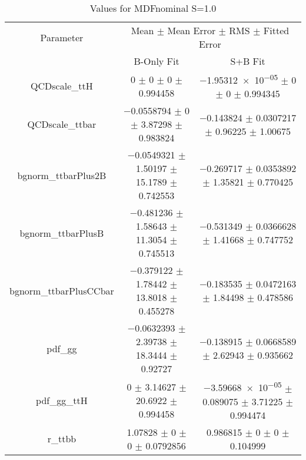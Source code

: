 \begin{table}
\centering
\caption{Values for MDFnominal S=1.0}
\begin{tabular}{ccc}
\toprule
Parameter & \multicolumn{2}{c}{Mean $\pm$ Mean Error $\pm$ RMS $\pm$ Fitted Error}\\
 & B-Only Fit & S+B Fit\\
\midrule
QCDscale\_ttH & \num{0} $\pm$ \num{0} $\pm$ \num{0} $\pm$ \num{0.994458} & \num{-1.95312e-05} $\pm$ \num{0} $\pm$ \num{0} $\pm$ \num{0.994345}\\
QCDscale\_ttbar & \num{-0.0558794} $\pm$ \num{0} $\pm$ \num{3.87298} $\pm$ \num{0.983824} & \num{-0.143824} $\pm$ \num{0.0307217} $\pm$ \num{0.96225} $\pm$ \num{1.00675}\\
bgnorm\_ttbarPlus2B & \num{-0.0549321} $\pm$ \num{1.50197} $\pm$ \num{15.1789} $\pm$ \num{0.742553} & \num{-0.269717} $\pm$ \num{0.0353892} $\pm$ \num{1.35821} $\pm$ \num{0.770425}\\
bgnorm\_ttbarPlusB & \num{-0.481236} $\pm$ \num{1.58643} $\pm$ \num{11.3054} $\pm$ \num{0.745513} & \num{-0.531349} $\pm$ \num{0.0366628} $\pm$ \num{1.41668} $\pm$ \num{0.747752}\\
bgnorm\_ttbarPlusCCbar & \num{-0.379122} $\pm$ \num{1.78442} $\pm$ \num{13.8018} $\pm$ \num{0.455278} & \num{-0.183535} $\pm$ \num{0.0472163} $\pm$ \num{1.84498} $\pm$ \num{0.478586}\\
pdf\_gg & \num{-0.0632393} $\pm$ \num{2.39738} $\pm$ \num{18.3444} $\pm$ \num{0.92727} & \num{-0.138915} $\pm$ \num{0.0668589} $\pm$ \num{2.62943} $\pm$ \num{0.935662}\\
pdf\_gg\_ttH & \num{0} $\pm$ \num{3.14627} $\pm$ \num{20.6922} $\pm$ \num{0.994458} & \num{-3.59668e-05} $\pm$ \num{0.089075} $\pm$ \num{3.71225} $\pm$ \num{0.994474}\\
r\_ttbb & \num{1.07828} $\pm$ \num{0} $\pm$ \num{0} $\pm$ \num{0.0792856} & \num{0.986815} $\pm$ \num{0} $\pm$ \num{0} $\pm$ \num{0.104999}\\
\bottomrule
\end{tabular}
\end{table}